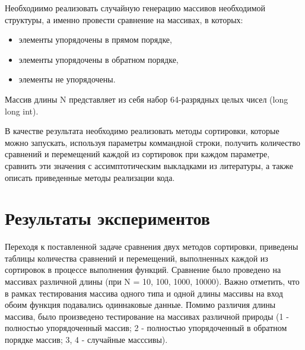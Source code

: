 \documentclass[a4paper,12pt,titlepage,finall]{article}
\begin{document}
Необходиимо реализовать случайную генерацию массивов необходимой структуры, а именно провести сравнение на массивах, в которых:
\begin{itemize}
\item элементы упорядочены в прямом порядке,
\item элементы упорядочены в обратном порядке,
\item элементы не упорядочены.
\end{itemize}

Массив длины N представляет из себя набор 64-разрядных целых чисел (long long int). \par

В качестве результата необходимо реализовать методы сортировки, которые можно запускать, используя параметры коммандной строки, получить количество сравнений и перемещений каждой из сортировок при каждом параметре, сравнить эти значения с ассимптотическим выкладками из литературы, а также описать приведенные методы реализации кода.\par

\newpage

\section{Результаты экспериментов}

Переходя к поставленной задаче сравнения двух методов сортировки, приведены таблицы количества сравнений и перемещений, выполненных каждой из сортировок в процессе выполнения функций. Сравнение было проведено на массивах различной длины (при N = 10, 100, 1000, 10000). Важно отметить, что в рамках тестирования массива одного типа и одной длины массивы на вход обоим функция подавались одиннаковые данные. Помимо различия длины массива, было произведено тестирование на массивах различной природы (1 - полностью упорядоченный массив; 2 - полностью упорядоченный в обратном порядке массив; 3, 4 - случайные масссивы).
\end{document}
